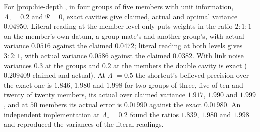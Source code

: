 \begin{numcheck}
For \cref{prop:hie-depth}, in four groups of five members with unit information, $\Lambda_\circ=0.2$ and $\Psi=0$, exact cavities give claimed, actual and optimal variance $0.04950$. Literal reading at the member level only puts weights in the ratio $2:1:1$ on the member's own datum, a group-mate's and another group's, with actual variance $0.0516$ against the claimed $0.0472$; literal reading at both levels gives $3:2:1$, with actual variance $0.0586$ against the claimed $0.0382$. With link noise variances $0.3$ at the groups and $0.2$ at the members the double cavity is exact ($0.209409$ claimed and actual). At $\Lambda_\circ=0.5$ the shortcut's believed precision over the exact one is $1.846$, $1.980$ and $1.998$ for two groups of three, five of ten and twenty of twenty members, its actual over claimed variance $1.917$, $1.990$ and $1.999$, and at $50$ members its actual error is $0.01990$ against the exact $0.01980$. An independent implementation at $\Lambda_\circ=0.2$ found the ratios $1.839$, $1.980$ and $1.998$ and reproduced the variances of the literal readings.
\end{numcheck}

